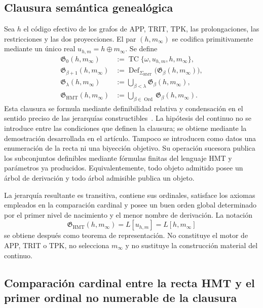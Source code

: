 \subsection{Clausura semántica genealógica}

Sea \(h\) el código efectivo de los grafos de APP, TRIT, TPK, las
prolongaciones, las restricciones y las dos proyecciones. El par
\((h,m_\infty)\) se codifica primitivamente mediante un único real
\(u_{h,m}=h\oplus m_\infty\). Se define
\[
 \begin{aligned}
 \mathfrak G_0(h,m_\infty)
   &:=\operatorname{TC}\{\omega,u_{h,m},h,m_\infty\},\\
 \mathfrak G_{\beta+1}(h,m_\infty)
   &:=\operatorname{Def}_{\Sigma_{\mathrm{HMT}}}
        \bigl(\mathfrak G_\beta(h,m_\infty)\bigr),\\
 \mathfrak G_\lambda(h,m_\infty)
   &:=\bigcup_{\beta<\lambda}\mathfrak G_\beta(h,m_\infty),\\
 \mathfrak G_{\mathrm{HMT}}(h,m_\infty)
   &:=\bigcup_{\beta\in\operatorname{Ord}}
        \mathfrak G_\beta(h,m_\infty).
 \end{aligned}
\]
Esta clausura se formula mediante definibilidad relativa y condensación en el
sentido preciso de las jerarquías constructibles~\cite{Jech2003}. La hipótesis
del continuo no se introduce entre las condiciones que definen la clausura; se
obtiene mediante la demostración desarrollada en el artículo. Tampoco se
introducen como datos una enumeración de la recta ni una biyección objetivo. Su
operación sucesora publica los subconjuntos definibles mediante fórmulas finitas
del lenguaje HMT y parámetros ya producidos.
Equivalentemente, todo objeto admitido posee un árbol de derivación y todo
árbol admisible publica un objeto.

La jerarquía resultante es transitiva, contiene sus ordinales, satisface los
axiomas empleados en la comparación cardinal y posee un buen orden global
determinado por el primer nivel de nacimiento y el menor nombre de derivación.
La notación
\[
 \mathfrak G_{\mathrm{HMT}}(h,m_\infty)
 =L[u_{h,m}]=L[h,m_\infty]
\]
se obtiene después como teorema de representación. No constituye el motor de
APP, TRIT o TPK, no selecciona \(m_\infty\) y no sustituye la construcción
material del continuo.

\subsection{Comparación cardinal entre la recta HMT y el primer ordinal no numerable de la clausura}

